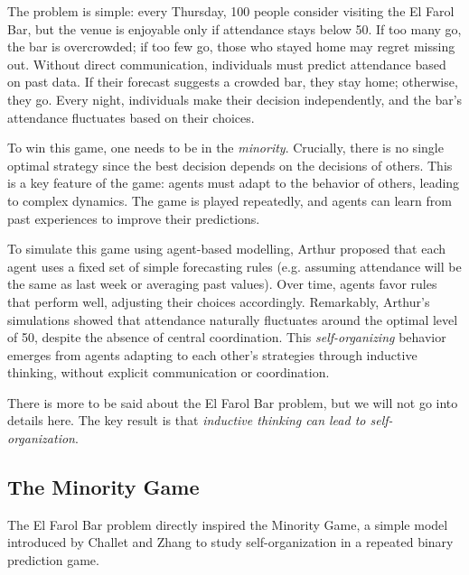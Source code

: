 \documentclass[a4paper, amsfonts, amssymb, amsmath, reprint, showkeys, nofootinbib, twoside]{revtex4-1}
\begin{document}
The problem is simple: every Thursday, 100 people consider visiting the El Farol Bar, but the venue is enjoyable only if attendance stays below 50. If too many go, the bar is overcrowded; if too few go, those who stayed home may regret missing out. Without direct communication, individuals must predict attendance based on past data. If their forecast suggests a crowded bar, they stay home; otherwise, they go. Every night, individuals make their decision independently, and the bar's attendance fluctuates based on their choices.

To win this game, one needs to be in the \textit{minority}. Crucially, there is no single optimal strategy since the best decision depends on the decisions of others. This is a key feature of the game: agents must adapt to the behavior of others, leading to complex dynamics. The game is played repeatedly, and agents can learn from past experiences to improve their predictions.

To simulate this game using agent-based modelling, Arthur proposed that each agent uses a fixed set of simple forecasting rules (e.g. assuming attendance will be the same as last week or averaging past values). Over time, agents favor rules that perform well, adjusting their choices accordingly. Remarkably, Arthur's simulations showed that attendance naturally fluctuates around the optimal level of 50, despite the absence of central coordination. This \textit{self-organizing} behavior emerges from agents adapting to each other’s strategies through inductive thinking, without explicit communication or coordination.

There is more to be said about the El Farol Bar problem, but we will not go into details here. The key result is that \textit{inductive thinking can lead to self-organization}.


\subsection{The Minority Game}

The El Farol Bar problem directly inspired the Minority Game, a simple model introduced by Challet and Zhang \cite{Challet_1997} to study self-organization in a repeated binary prediction game.
\end{document}
